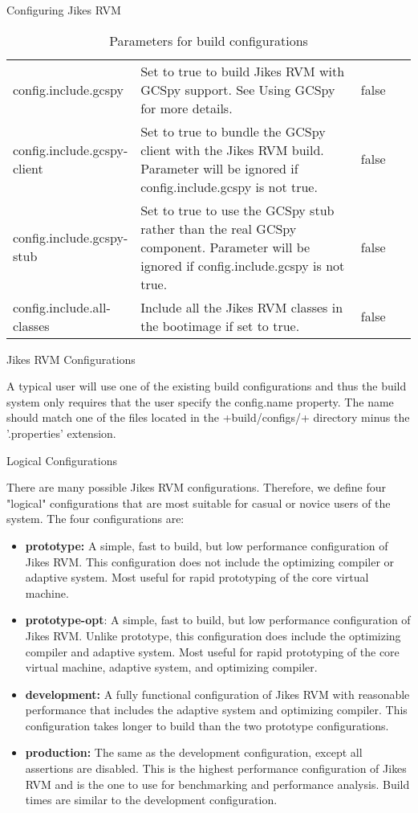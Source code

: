 \begin{chapter}{Configuring Jikes RVM}
\begin{table}
\begin{tabular}{p{0.25\linewidth}p{0.6\linewidth}p{0.15\linewidth}}
config.include.gcspy & Set to true to build Jikes RVM with GCSpy support. See Using GCSpy for more details. & false \\
config.include.gcspy-client & Set to true to bundle the GCSpy client with the Jikes RVM build. Parameter will be ignored if config.include.gcspy is not true. & false \\
config.include.gcspy-stub & Set to true to use the GCSpy stub rather than the real GCSpy component. Parameter will be ignored if config.include.gcspy is not true. & false \\
config.include.all-classes & Include all the Jikes RVM classes in the bootimage if set to true. & false \\
\end{tabular}
\caption{Parameters for build configurations}
\end{table}

\begin{section}{Jikes RVM Configurations}

A typical user will use one of the existing build configurations and thus the build system only requires that the user specify the config.name property. The name should match one of the files located in the \spverb+build/configs/+ directory minus the '.properties' extension.

\begin{subsection}{Logical Configurations}

There are many possible Jikes RVM configurations. Therefore, we define four "logical" configurations that are most suitable for casual or novice users of the system. The four configurations are:

\begin{itemize}
  \item \textbf{prototype:} A simple, fast to build, but low performance configuration of Jikes RVM. This configuration does not include the optimizing compiler or adaptive system. Most useful for rapid prototyping of the core virtual machine.
  \item \textbf{prototype-opt}: A simple, fast to build, but low performance configuration of Jikes RVM. Unlike prototype, this configuration does include the optimizing compiler and adaptive system. Most useful for rapid prototyping of the core virtual machine, adaptive system, and optimizing compiler.
  \item \textbf{development:} A fully functional configuration of Jikes RVM with reasonable performance that includes the adaptive system and optimizing compiler. This configuration takes longer to build than the two prototype configurations.
  \item \textbf{production:} The same as the development configuration, except all assertions are disabled. This is the highest performance configuration of Jikes RVM and is the one to use for benchmarking and performance analysis. Build times are similar to the development configuration.
\end{itemize}


\end{subsection}
\end{section}
\end{chapter}
